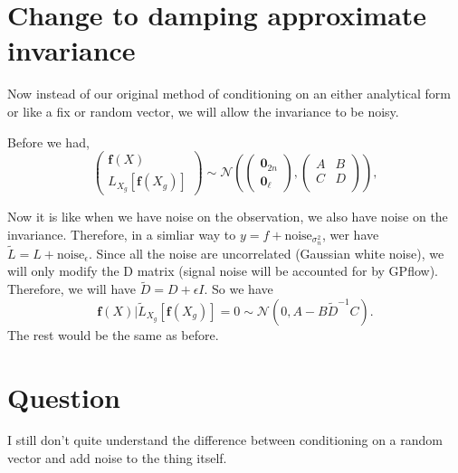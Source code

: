 \documentclass{article}
\begin{document}
\section*{Change to damping approximate invariance}
Now instead of our original method of conditioning on an either analytical form or like a fix or random vector, we will allow the invariance to be noisy.

Before we had, 
$$
\begin{pmatrix}
  \mathbf{f}(X) \\ L_{X_g}[\mathbf{f}(X_g)]
\end{pmatrix}
\sim \mathcal{N}
\left(
\begin{pmatrix}
  \mathbf{0}_{2n} \\ \mathbf{0}_{\ell}
\end{pmatrix},
\begin{pmatrix}
A & B \\C&D\\
\end{pmatrix}
\right), 
$$

Now it is like when we have noise on the observation, we also have noise on the invariance. 
Therefore, in a simliar way to $y=f+\text{noise}_{\sigma^2_n}$, wer have $\tilde{L} = L+\text{noise}_{\epsilon}$. 
Since all the noise are uncorrelated (Gaussian white noise), we will only modify the D matrix (signal noise will be accounted for by GPflow).
Therefore, we will have $\tilde{D}=D+\epsilon I$.
So we have 
$$
\mathbf{f}(X) | \tilde{L}_{X_g}[\mathbf{f}(X_g)]=0 \sim \mathcal{N} \left(0, A-B\tilde{D}^{-1}C\right).
$$
The rest would be the same as before. 

\section*{Question}
I still don't quite understand the difference between conditioning on a random vector and add noise to the thing itself.
\end{document}
